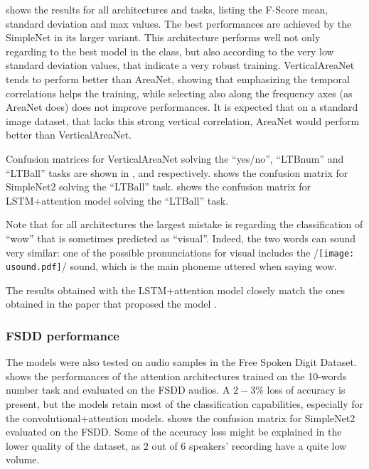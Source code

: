  shows the results for all architectures and tasks,
listing the F-Score mean, standard deviation and max values.
%
The best performances are achieved by the SimpleNet in its larger variant. This
architecture performs well not only regarding to the best model in the class,
but also according to the very low standard deviation values, that indicate a
very robust training.
%
VerticalAreaNet tends to perform better than AreaNet, showing that emphasizing
the temporal correlations helps the training, while selecting also along the
frequency axes (as AreaNet does) does not improve performances.
%
It is expected that on a standard image dataset, that lacks this strong
vertical correlation, AreaNet would perform better than VerticalAreaNet.

% 


Confusion matrices for VerticalAreaNet solving the ``yes/no'', ``LTBnum'' and
``LTBall'' tasks are shown in ,
 and
 respectively.
%
 shows the confusion
matrix for SimpleNet2 solving the ``LTBall'' task.
%
shows the confusion matrix for LSTM+attention model solving the ``LTBall''
task.

Note that for all architectures the largest mistake is regarding the
classification of ``wow'' that is sometimes predicted as ``visual''. Indeed,
the two words can sound very similar: one of the possible pronunciations for
visual includes the 
/\texttt{[image: usound.pdf]}/ sound, which is the main phoneme
uttered when saying wow.

The results obtained with the LSTM+attention model closely match the ones
obtained in the paper that proposed the model \cite{2018arXiv180808929C}.

\subsubsection{FSDD performance}

The models were also tested on audio samples in the Free Spoken Digit Dataset.
 shows the performances of the attention
architectures trained on the 10-words number task and evaluated on the FSDD
audios.
%
A $2-3\%$ loss of accuracy is present, but the models retain most of the
classification capabilities, especially for the convolutional+attention models.
%
 shows the
confusion matrix for SimpleNet2 evaluated on the FSDD.
%
Some of the accuracy loss might be explained in the lower quality of the
dataset, as $2$ out of $6$ speakers' recording have a quite low volume.

